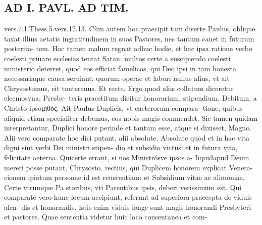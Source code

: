 \documentclass{article}
\begin{document}
\begin{pages}
\section*{AD I. PAVL. AD TIM. }
\marginpar{[ p.306 ]}\pstart vers.7.1.Thess.5.vers.12.13.  \pend\pstart Cùm autem hoc praecipit tam diserte Paulus, oblique taxat illius aetatis ingratitudinem in suos Pastores, nec tantum cauet in futuram posterita- tem. Hoc tamen malum regnat adhuc hodie, et hac ipsa ratione verbo coelesti priuare ecclesias tentat Satan: multos certe a suscipiendo coelesti ministerio deterret, quod eos efficiat famelicos, qui Deo ipsi in tam honesta necessariaque causa seruiant: quorum operae et labori nullus alius, vt ait Chrysostomus, eit tontereuus. Et recte. Ergo quod aliis collatum diceretur eleemosyna, Presby- teris praestitum dicitur honorarium, stipendium, Debitum, a Christo ipsoμιθὸς.  \pend\pstart Ait Paulus Duplicis, vt caeterorum compara- tione, quibus aliquid etiam specialiter debemus, eos nobis magis commendet. Sic tamen quidam interpretantur, Duplici honore perinde et tantum esse, atque si dixisset, Magno. Alii vero comparate hoc dici putant, alii absolute. Absolute quod et in hac vita digni sint verbi Dei ministri stipen- dio et subsidio victus: et in futura vita, felicitate aeterna. Quicerte errant, si nos Ministrósve ipsos a- Iiquidapud Deum mereri posse putant. Chrysosto. rectius, qui Duplicem honorem explicat Venera- cionem ipiotum personae id est reuerentiam: et Subsidium vitae ac alimoniae. Certe vtrumque Pa storibus, vti Parentibus ipsis, deberi verissimum est. Qui comparate vero hunc locum accipiunt, referunt ad superiora praecepta de viduis alen- dis et honorandis. Istis enim viduis longe sunt magis honorandi Presbyteri et pastores. Quae sententia videtur huic loco consentanea et com-  \pend

\end{pages}
\end{document}
